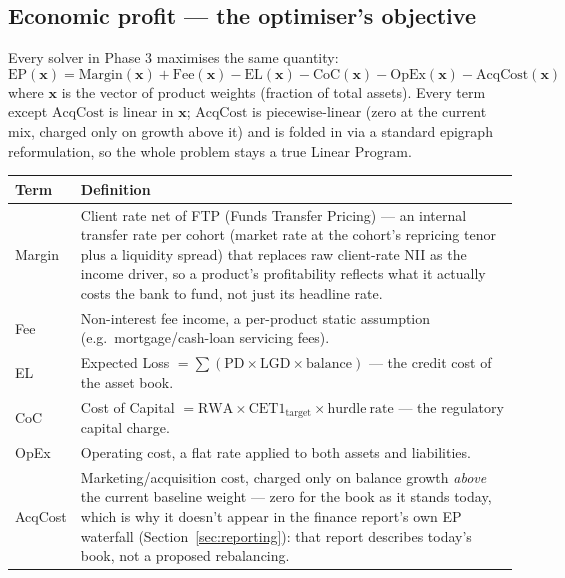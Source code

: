 \documentclass[11pt,a4paper]{article}
\begin{document}
\subsection{Economic profit --- the optimiser's objective}
Every solver in Phase 3 maximises the same quantity:
\[
\mathrm{EP}(\mathbf{x}) = \mathrm{Margin}(\mathbf{x}) + \mathrm{Fee}(\mathbf{x})
  - \mathrm{EL}(\mathbf{x}) - \mathrm{CoC}(\mathbf{x}) - \mathrm{OpEx}(\mathbf{x})
  - \mathrm{AcqCost}(\mathbf{x})
\]
where $\mathbf{x}$ is the vector of product weights (fraction of total assets).
Every term except $\mathrm{AcqCost}$ is linear in $\mathbf{x}$; $\mathrm{AcqCost}$
is piecewise-linear (zero at the current mix, charged only on growth above it)
and is folded in via a standard epigraph reformulation, so the whole problem
stays a true Linear Program.

\begin{center}
\small
\begin{tabular}{@{}p{2.6cm}p{11.5cm}@{}}
\toprule
\textbf{Term} & \textbf{Definition} \\
\midrule
Margin & Client rate net of FTP (Funds Transfer Pricing) --- an internal
  transfer rate per cohort (market rate at the cohort's repricing tenor plus
  a liquidity spread) that replaces raw client-rate NII as the income
  driver, so a product's profitability reflects what it actually costs the
  bank to fund, not just its headline rate. \\
Fee & Non-interest fee income, a per-product static assumption (e.g.\
  mortgage/cash-loan servicing fees). \\
EL & Expected Loss $= \sum(\mathrm{PD} \times \mathrm{LGD} \times \mathrm{balance})$
  --- the credit cost of the asset book. \\
CoC & Cost of Capital $= \mathrm{RWA} \times \mathrm{CET1}_{\mathrm{target}}
  \times \mathrm{hurdle\ rate}$ --- the regulatory capital charge. \\
OpEx & Operating cost, a flat rate applied to both assets and liabilities. \\
AcqCost & Marketing/acquisition cost, charged only on balance growth
  \textit{above} the current baseline weight --- zero for the book as it
  stands today, which is why it doesn't appear in the finance report's own
  EP waterfall (Section~\ref{sec:reporting}): that report describes today's
  book, not a proposed rebalancing. \\
\bottomrule
\end{tabular}
\end{center}
\end{document}
